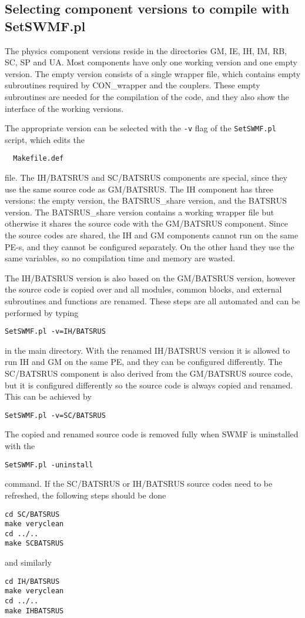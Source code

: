 \subsection{Selecting component versions to compile with SetSWMF.pl}

The physics component versions reside in the directories 
GM, IE, IH, IM, RB, SC,
SP and UA.
Most components have only one working version and one empty version.
The empty version consists of a single wrapper file, which contains 
empty subroutines required by CON\_wrapper and the couplers.
These empty subroutines are needed for the compilation of the code,
and they also show the interface of the working versions.

The appropriate version can be selected with the {\tt -v} flag
of the {\tt SetSWMF.pl} script, which edits the
\begin{verbatim}
  Makefile.def
\end{verbatim}
file. The IH/BATSRUS and SC/BATSRUS components are special, since they use the
same source code as GM/BATSRUS. The IH component has three versions: 
the empty version, the BATSRUS\_share version, and the BATSRUS version. 
The BATSRUS\_share version contains a working wrapper file but otherwise 
it shares the source code
with the GM/BATSRUS component. Since the source codes are shared, the
IH and GM components cannot run on the same PE-s, and they cannot be
configured separately. On the other hand they use the same variables,
so no compilation time and memory are wasted.

The IH/BATSRUS version is also based on the GM/BATSRUS version, however
the source code is copied over and all modules, common blocks,
and external subroutines and functions are renamed. 
These steps are all automated and can be performed by typing
\begin{verbatim}
SetSWMF.pl -v=IH/BATSRUS
\end{verbatim}
in the main directory. With the renamed IH/BATSRUS version it is allowed 
to run IH and GM on the same PE, and they can be configured differently.
The SC/BATSRUS component is also derived from the GM/BATSRUS source code,
but it is configured differently so the source code is always copied
and renamed. This can be achieved by
\begin{verbatim}
SetSWMF.pl -v=SC/BATSRUS
\end{verbatim}
The copied and renamed source code is removed fully when SWMF is
uninstalled with the
\begin{verbatim}
SetSWMF.pl -uninstall
\end{verbatim}
command. If the SC/BATSRUS or IH/BATSRUS source codes need to be
refreshed, the following steps should be done
\begin{verbatim}
cd SC/BATSRUS
make veryclean
cd ../..
make SCBATSRUS
\end{verbatim}
and similarly
\begin{verbatim}
cd IH/BATSRUS
make veryclean
cd ../..
make IHBATSRUS
\end{verbatim}

